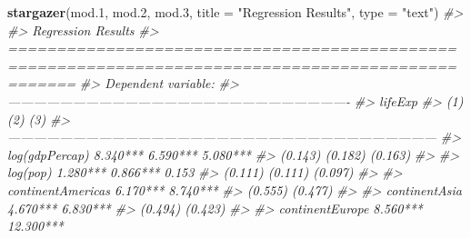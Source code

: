 \documentclass[]{book}
\newenvironment{Shaded}{\begin{snugshade}}{\end{snugshade}}
\newcommand{\KeywordTok}[1]{\textcolor[rgb]{0.13,0.29,0.53}{\textbf{#1}}}
\newcommand{\DataTypeTok}[1]{\textcolor[rgb]{0.13,0.29,0.53}{#1}}
\newcommand{\DecValTok}[1]{\textcolor[rgb]{0.00,0.00,0.81}{#1}}
\newcommand{\StringTok}[1]{\textcolor[rgb]{0.31,0.60,0.02}{#1}}
\newcommand{\CommentTok}[1]{\textcolor[rgb]{0.56,0.35,0.01}{\textit{#1}}}
\newcommand{\NormalTok}[1]{#1}
\begin{document}
\begin{Shaded}
\begin{Highlighting}[]
\KeywordTok{stargazer}\NormalTok{(mod.}\DecValTok{1}\NormalTok{, mod.}\DecValTok{2}\NormalTok{, mod.}\DecValTok{3}\NormalTok{, }\DataTypeTok{title =} \StringTok{"Regression Results"}\NormalTok{, }\DataTypeTok{type =} \StringTok{"text"}\NormalTok{)}
\CommentTok{#> }
\CommentTok{#> Regression Results}
\CommentTok{#> ===================================================================================================}
\CommentTok{#>                                                   Dependent variable:                              }
\CommentTok{#>                     -------------------------------------------------------------------------------}
\CommentTok{#>                                                         lifeExp                                    }
\CommentTok{#>                                 (1)                        (2)                       (3)           }
\CommentTok{#> ---------------------------------------------------------------------------------------------------}
\CommentTok{#> log(gdpPercap)               8.340***                   6.590***                  5.080***         }
\CommentTok{#>                               (0.143)                    (0.182)                   (0.163)         }
\CommentTok{#>                                                                                                    }
\CommentTok{#> log(pop)                     1.280***                   0.866***                    0.153          }
\CommentTok{#>                               (0.111)                    (0.111)                   (0.097)         }
\CommentTok{#>                                                                                                    }
\CommentTok{#> continentAmericas                                       6.170***                  8.740***         }
\CommentTok{#>                                                          (0.555)                   (0.477)         }
\CommentTok{#>                                                                                                    }
\CommentTok{#> continentAsia                                           4.670***                  6.830***         }
\CommentTok{#>                                                          (0.494)                   (0.423)         }
\CommentTok{#>                                                                                                    }
\CommentTok{#> continentEurope                                         8.560***                  12.300***        }

\end{Highlighting}
\end{Shaded}
\end{document}
